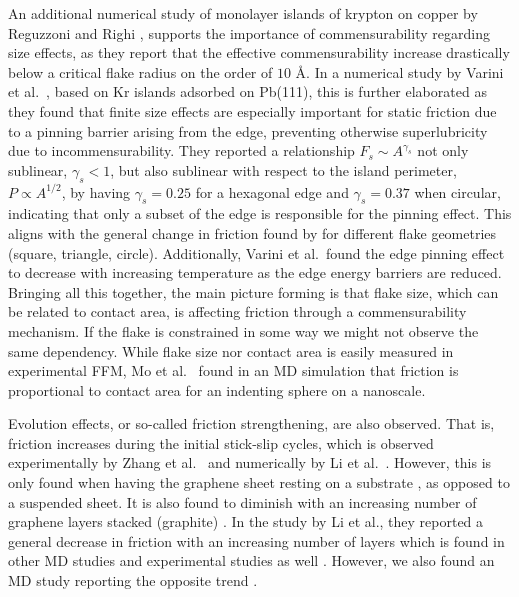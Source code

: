 An additional numerical study of monolayer islands of krypton on copper by
Reguzzoni and Righi \cite{PhysRevB.85.201412}, supports the importance of
commensurability regarding size effects, as they report that the effective
commensurability increase drastically below a critical flake radius on the order
of $10$ Å. In a numerical study by Varini et al.\ \cite{Varini_2015}, based on
Kr islands adsorbed on Pb(111), this is further elaborated as they found that
finite size effects are especially important for static friction due to a
pinning barrier arising from the edge, preventing otherwise superlubricity due
to incommensurability. They reported a relationship $F_s \sim A^{\gamma_s}$ not
only sublinear, $\gamma_s < 1$, but also sublinear with respect to the island
perimeter, $P \propto A^{1/2}$, by having $\gamma_s = 0.25$ for a hexagonal edge
and $\gamma_s = 0.37$ when circular, indicating that only a subset of the edge
is responsible for the pinning effect. This aligns with the general change in
friction found by \cite{zhu_study_2018} for different flake geometries (square,
triangle, circle). Additionally, Varini et al.\ found the edge pinning effect to
decrease with increasing temperature as the edge energy barriers are reduced.
Bringing all this together, the main picture forming is that flake size, which
can be related to contact area, is affecting friction through a commensurability
mechanism. If the flake is constrained in some way we might not observe the same
dependency. While flake size nor contact area is easily measured in experimental
\acrshort{FFM}, Mo et al.\ \cite{mo_friction_2009} found in an \acrshort{MD} simulation that friction is proportional to contact area for an indenting sphere on a nanoscale.



Evolution effects, or so-called friction strengthening, are also observed. That
is, friction increases during the initial stick-slip cycles, which is observed
experimentally by Zhang et al.\ \cite{zhang_tuning_2019} and numerically by Li
et al.\ \cite{li_evolving_2016}. However, this is only found when having the
graphene sheet resting on a substrate \cite{zhang_tuning_2019}, as opposed to a
suspended sheet. It is also found to diminish with an increasing number of
graphene layers stacked (graphite) \cite{li_evolving_2016}. In the study by Li
et al., they reported a general decrease in friction with an increasing number of layers which is found in other \acrshort{MD} studies \cite{Yoon2015MolecularDS} and experimental studies as well \cite{Filleter_2009, Lee_2010}. However, we also found an \acrshort{MD} study reporting the opposite trend \cite{Reguzzoni_2012}.


